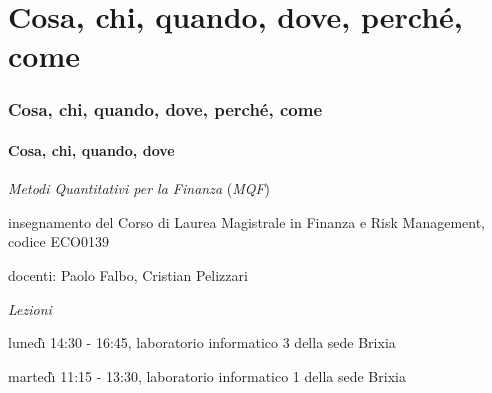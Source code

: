%
%

\color{light-blue}
\color{black}%
\medskip

\section{Cosa, chi, quando, dove, perch\'{e}, come}%

\begin{frame}%
%

\frametitle{Cosa, chi, quando, dove, perch\'{e}, come}%
%

\framesubtitle{Cosa, chi, quando, dove}%
%

%


\begin{stepitemize}
\item \textit{Metodi Quantitativi per la Finanza} (\textit{MQF})

\begin{stepitemize}
\item insegnamento del Corso di Laurea Magistrale in Finanza e Risk
Management, codice ECO0139

\item docenti: Paolo Falbo, Cristian Pelizzari
\end{stepitemize}

\item \textit{Lezioni}

\begin{stepitemize}
\item luned\`{\i} 14:30 - 16:45, laboratorio informatico 3 della sede Brixia

\item marted\`{\i} 11:15 - 13:30, laboratorio informatico 1 della sede Brixia
\end{stepitemize}
\end{stepitemize}

%

\transboxout
\end{frame}%
%


